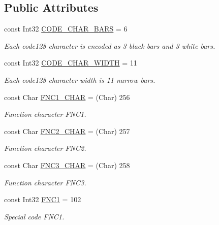 \subsection*{Public Attributes}
\begin{DoxyCompactItemize}
\item 
const Int32 \hyperlink{class_pdf_file_writer_1_1_barcode128_a88bfc10bac4a96d9af356afd696957a4}{C\+O\+D\+E\+\_\+\+C\+H\+A\+R\+\_\+\+B\+A\+RS} = 6
\begin{DoxyCompactList}\small\item\em Each code128 character is encoded as 3 black bars and 3 white bars. \end{DoxyCompactList}\item 
const Int32 \hyperlink{class_pdf_file_writer_1_1_barcode128_a44dce9c13100a3d93cf13d039a9cc640}{C\+O\+D\+E\+\_\+\+C\+H\+A\+R\+\_\+\+W\+I\+D\+TH} = 11
\begin{DoxyCompactList}\small\item\em Each code128 character width is 11 narrow bars. \end{DoxyCompactList}\item 
const Char \hyperlink{class_pdf_file_writer_1_1_barcode128_afd9b16f97cc3a1044cab639947c74610}{F\+N\+C1\+\_\+\+C\+H\+AR} = (Char) 256
\begin{DoxyCompactList}\small\item\em Function character F\+N\+C1. \end{DoxyCompactList}\item 
const Char \hyperlink{class_pdf_file_writer_1_1_barcode128_ab4f16a88a329e17c929417f886956729}{F\+N\+C2\+\_\+\+C\+H\+AR} = (Char) 257
\begin{DoxyCompactList}\small\item\em Function character F\+N\+C2. \end{DoxyCompactList}\item 
const Char \hyperlink{class_pdf_file_writer_1_1_barcode128_a346e9a6b63130b61ac4d235a4e41e4f0}{F\+N\+C3\+\_\+\+C\+H\+AR} = (Char) 258
\begin{DoxyCompactList}\small\item\em Function character F\+N\+C3. \end{DoxyCompactList}\item 
const Int32 \hyperlink{class_pdf_file_writer_1_1_barcode128_a776c9658f90e61a977cb06bb7bcf80f9}{F\+N\+C1} = 102
\begin{DoxyCompactList}\small\item\em Special code F\+N\+C1. \end{DoxyCompactList}\item 

\end{DoxyCompactItemize}
